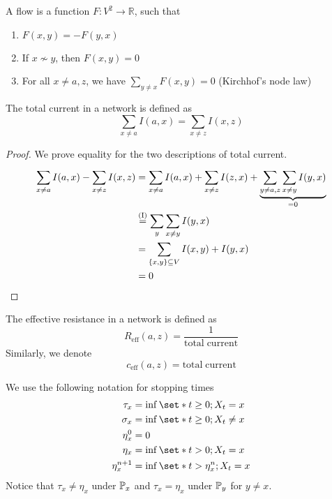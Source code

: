 \begin{defn}[Flow]
    A flow is a function \(F: V^2\to \mathbb{R}\), such that 
    \begin{enumerate}
      \item \(F(x,y) = -F(y,x)\)
      \item If $x \nsim y$, then \(F(x,y)=0\)
      \item For all \(x\neq a,z\), we have \(\sum_{y\neq x} F(x,y)=0\) (Kirchhof's node law)
    \end{enumerate}    
\end{defn}


\begin{defn}
    The total current in a network is defined as 
    \[\sum_{x\neq a} I(a,x)  =\sum_{x\neq z} I(x,z)\]
\end{defn}

\begin{proof}
    We prove equality for the two descriptions of total current.
    \begin{align*}
      \sum_{x\neq a} I(a,x) - \sum_{x \neq z} I(x,z) &= \sum_{x \neq a}^{} I(a,x) + \sum_{x \neq z}^{} I(z,x) + \underbrace{\sum_{y \neq a,z} \sum_{x \neq y} I(y,x)}_{=0} \\
                                                     & \stackrel{(\mathrm{I})}{=} \sum_{y} \sum_{x \neq y} I(y,x) \\
                                                     &=\sum_{\{x,y\} \subseteq V} I(x,y) + I(y,x) \\
                                                     &= 0
    \end{align*}
\end{proof}


\begin{defn}
    The effective resistance in a network is defined as 
    \[R_{\mathrm{eff}}(a,z) = \frac{1}{\mathrm{total\;current}}\]
    Similarly, we denote
    \[c_{\mathrm{eff}}(a,z) = \mathrm{total\;current}\]
\end{defn}


\begin{nota}
    We use the following notation for stopping times 
    \begin{align*}
      \tau_x  &= \inf \set*{t\geq0; X_t=x} \\
      \sigma_x &= \inf \set*{t\geq0; X_t\neq x} \\
      \eta_x^0 &=0 \\
      \eta_x &= \inf \set*{t>0; X_t=x} \\
      \eta_x^{n+1} &= \inf \set*{t > \eta_x^n; X_t=x }
    \end{align*}
    Notice that $\tau_x \neq \eta_x$ under $\mathbb{P}_x$ and $\tau_x=\eta_x$ under $\mathbb{P}_y$ for $y\neq x$.
\end{nota}


